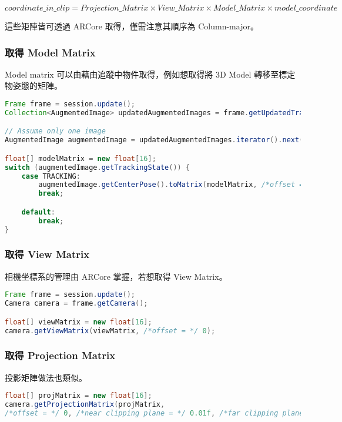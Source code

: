 \begin{center}
    $
        coordinate\_in\_clip = Projection\_Matrix \times View\_Matrix \times Model\_Matrix \times model\_coordinate
    $
\end{center}

這些矩陣皆可透過 ARCore 取得，僅需注意其順序為 Column-major。

\subsubsection{取得 Model Matrix}

Model matrix 可以由藉由追蹤中物件取得，例如想取得將 3D Model 轉移至標定物姿態的矩陣。

\begin{lstlisting}[language=Java, caption=將 3D model 的座標空間轉移至以標定物為準的空間]
Frame frame = session.update();
Collection<AugmentedImage> updatedAugmentedImages = frame.getUpdatedTrackables(AugmentedImage.class);

// Assume only one image
AugmentedImage augmentedImage = updatedAugmentedImages.iterator().next();

float[] modelMatrix = new float[16];
switch (augmentedImage.getTrackingState()) {
    case TRACKING:
        augmentedImage.getCenterPose().toMatrix(modelMatrix, /*offset = */ 0);
        break;

    default:
        break;
}
\end{lstlisting}

\subsubsection{取得 View Matrix}

相機坐標系的管理由 ARCore 掌握，若想取得 View Matrix。

\begin{lstlisting}[language=Java, caption=取得 View Matrix]
Frame frame = session.update();
Camera camera = frame.getCamera();

float[] viewMatrix = new float[16];
camera.getViewMatrix(viewMatrix, /*offset = */ 0);
\end{lstlisting}

\subsubsection{取得 Projection Matrix}

投影矩陣做法也類似。

\begin{lstlisting}[language=Java, caption=取得 Projection Matrix]
float[] projMatrix = new float[16];
camera.getProjectionMatrix(projMatrix,
/*offset = */ 0, /*near clipping plane = */ 0.01f, /*far clipping plane = */ 15.0f);
\end{lstlisting}

